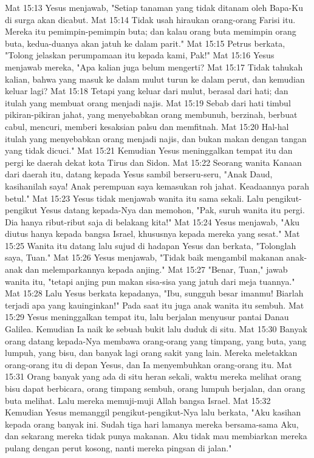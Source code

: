 Mat 15:13  Yesus menjawab, "Setiap tanaman yang tidak ditanam oleh Bapa-Ku di surga akan dicabut.
Mat 15:14  Tidak usah hiraukan orang-orang Farisi itu. Mereka itu pemimpin-pemimpin buta; dan kalau orang buta memimpin orang buta, kedua-duanya akan jatuh ke dalam parit."
Mat 15:15  Petrus berkata, "Tolong jelaskan perumpamaan itu kepada kami, Pak!"
Mat 15:16  Yesus menjawab mereka, "Apa kalian juga belum mengerti?
Mat 15:17  Tidak tahukah kalian, bahwa yang masuk ke dalam mulut turun ke dalam perut, dan kemudian keluar lagi?
Mat 15:18  Tetapi yang keluar dari mulut, berasal dari hati; dan itulah yang membuat orang menjadi najis.
Mat 15:19  Sebab dari hati timbul pikiran-pikiran jahat, yang menyebabkan orang membunuh, berzinah, berbuat cabul, mencuri, memberi kesaksian palsu dan memfitnah.
Mat 15:20  Hal-hal itulah yang menyebabkan orang menjadi najis, dan bukan makan dengan tangan yang tidak dicuci."
Mat 15:21  Kemudian Yesus meninggalkan tempat itu dan pergi ke daerah dekat kota Tirus dan Sidon.
Mat 15:22  Seorang wanita Kanaan dari daerah itu, datang kepada Yesus sambil berseru-seru, "Anak Daud, kasihanilah saya! Anak perempuan saya kemasukan roh jahat. Keadaannya parah betul."
Mat 15:23  Yesus tidak menjawab wanita itu sama sekali. Lalu pengikut-pengikut Yesus datang kepada-Nya dan memohon, "Pak, suruh wanita itu pergi. Dia hanya ribut-ribut saja di belakang kita!"
Mat 15:24  Yesus menjawab, "Aku diutus hanya kepada bangsa Israel, khususnya kepada mereka yang sesat."
Mat 15:25  Wanita itu datang lalu sujud di hadapan Yesus dan berkata, "Tolonglah saya, Tuan."
Mat 15:26  Yesus menjawab, "Tidak baik mengambil makanan anak-anak dan melemparkannya kepada anjing."
Mat 15:27  "Benar, Tuan," jawab wanita itu, "tetapi anjing pun makan sisa-sisa yang jatuh dari meja tuannya."
Mat 15:28  Lalu Yesus berkata kepadanya, "Ibu, sungguh besar imanmu! Biarlah terjadi apa yang kauinginkan!" Pada saat itu juga anak wanita itu sembuh.
Mat 15:29  Yesus meninggalkan tempat itu, lalu berjalan menyusur pantai Danau Galilea. Kemudian Ia naik ke sebuah bukit lalu duduk di situ.
Mat 15:30  Banyak orang datang kepada-Nya membawa orang-orang yang timpang, yang buta, yang lumpuh, yang bisu, dan banyak lagi orang sakit yang lain. Mereka meletakkan orang-orang itu di depan Yesus, dan Ia menyembuhkan orang-orang itu.
Mat 15:31  Orang banyak yang ada di situ heran sekali, waktu mereka melihat orang bisu dapat berbicara, orang timpang sembuh, orang lumpuh berjalan, dan orang buta melihat. Lalu mereka memuji-muji Allah bangsa Israel.
Mat 15:32  Kemudian Yesus memanggil pengikut-pengikut-Nya lalu berkata, "Aku kasihan kepada orang banyak ini. Sudah tiga hari lamanya mereka bersama-sama Aku, dan sekarang mereka tidak punya makanan. Aku tidak mau membiarkan mereka pulang dengan perut kosong, nanti mereka pingsan di jalan."
